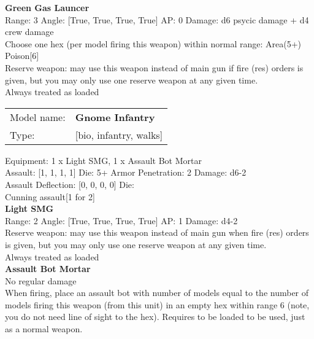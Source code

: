 {\bf Green Gas Launcer } \\



Range: 3  Angle: [True, True, True, True] AP: 0 Damage: d6 psycic damage + d4 crew damage \\
Choose one hex (per model firing this weapon) within normal range: Area(5+)\\ 
Poison[6]\\ 
Reserve weapon: may use this weapon instead of main gun if fire (res) orders is given, but you may only use one reserve weapon at any given time.\\ 
Always treated as loaded\\ 




 



\begin{tabular}{ll}
Model name: & {\bf Gnome Infantry } \\
Type: & [bio, infantry, walks] \\
\end{tabular}

Equipment: 1 x Light SMG, 1 x Assault Bot Mortar \\

Assault: [1, 1, 1, 1] Die: 5+ Armor Penetration: 2 Damage: d6-2 \\
Assault Deflection: [0, 0, 0, 0] Die: \\
\indent Cunning assault[1 for 2]\\ 
 



{\bf Light SMG } \\



Range: 2  Angle: [True, True, True, True] AP: 1 Damage: d4-2 \\
Reserve weapon: may use this weapon instead of main gun when fire (res) orders is given, but you may only use one reserve weapon at any given time.\\ 
Always treated as loaded\\ 




{\bf Assault Bot Mortar } \\

No regular damage\\ 
When firing, place an assault bot with number of models equal to the number of models firing this weapon (from this unit) in an empty hex within range 6 (note, you do not need line of sight to the hex). Requires to be loaded to be used, just as a normal weapon.\\ 





